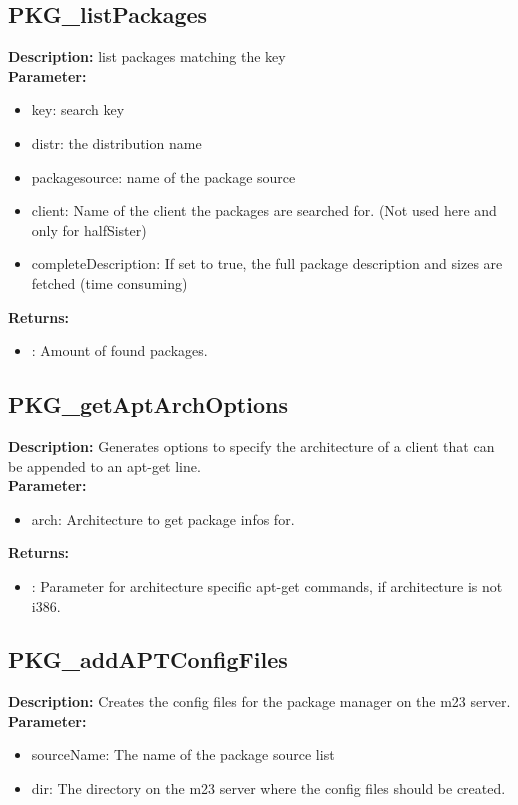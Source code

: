 \subsection{PKG\_listPackages}
\textbf{Description:} list packages matching the key\\
\textbf{Parameter:}
\begin{itemize}
\item key: search key
\item distr: the distribution name
\item packagesource: name of the package source
\item client: Name of the client the packages are searched for. (Not used here and only for halfSister)
\item completeDescription: If set to true, the full package description and sizes are fetched (time consuming)
\end{itemize}
\textbf{Returns:}
\begin{itemize}
\item : Amount of found packages.
\end{itemize}

\subsection{PKG\_getAptArchOptions}
\textbf{Description:} Generates options to specify the architecture of a client that can be appended to an apt-get line.\\
\textbf{Parameter:}
\begin{itemize}
\item arch: Architecture to get package infos for.
\end{itemize}
\textbf{Returns:}
\begin{itemize}
\item : Parameter for architecture specific apt-get commands, if architecture is not i386.
\end{itemize}

\subsection{PKG\_addAPTConfigFiles}
\textbf{Description:} Creates the config files for the package manager on the m23 server.\\
\textbf{Parameter:}
\begin{itemize}
\item sourceName: The name of the package source list
\item dir: The directory on the m23 server where the config files should be created.
\end{itemize}


